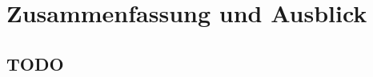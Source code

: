 \newpage
\slidetitle{}
\section{Zusammenfassung und Ausblick}


\begin{center}
\end{center}

\newpage
{}
\subsection{TODO}

\newpage
{}
\nocite{*}

